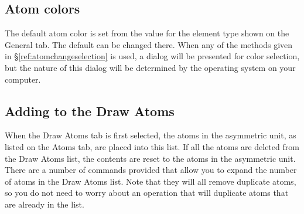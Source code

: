 \subsection{Atom colors}
The default atom color is set from the value for the element type shown on the General tab. The default can be changed there. When any of the methods given in \S\ref{ref:atomchangeselection} is used, a dialog will be presented for color selection, but the nature of this dialog will be determined by the operating system on your computer. 


\subsection{Adding to the Draw Atoms}
When the Draw Atoms tab is first selected, the atoms in the asymmetric unit, as listed on the Atoms tab, are placed into this list. If all the atoms are deleted from the Draw Atoms list, the contents are reset to the atoms in the asymmetric unit. There are a number of commands provided that allow you to expand the number of atoms in the Draw Atoms list. Note that they will all remove duplicate atoms, so you do not need to worry about an operation that will duplicate atoms that are already in the list. 
